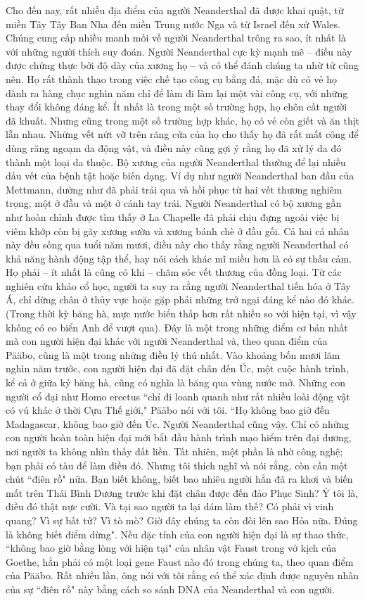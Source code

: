 \begin{multicols}{2}
	Cho đến nay, rất nhiều địa điểm của người Neanderthal đã được khai quật, từ miền Tây Tây Ban Nha đến miền Trung nước Nga và từ Israel đến xứ Wales. Chúng cung cấp nhiều manh mối về người Neanderthal trông ra sao, ít nhất là với những người thích suy đoán. Người Neanderthal cực kỳ mạnh mẽ -- điều này được chứng thực bởi độ dày của xương họ -- và có thể đánh chúng ta nhừ tử cũng nên. Họ rất thành thạo trong việc chế tạo công cụ bằng đá, mặc dù có vẻ họ dành ra hàng chục nghìn năm chỉ để làm đi làm lại một vài công cụ, với những thay đổi không đáng kể. Ít nhất là trong một số trường hợp, họ chôn cất người đã khuất. Nhưng cũng trong một số trường hợp khác, họ có vẻ còn giết và ăn thịt lẫn nhau. Những vết nứt vỡ trên răng cửa của họ cho thấy họ đã rất mất công để dùng răng ngoạm da động vật, và điều này cũng gợi ý rằng họ đã xử lý da đó thành một loại da thuộc. Bộ xương của người Neanderthal thường để lại nhiều dấu vết của bệnh tật hoặc biến dạng. Ví dụ như người Neanderthal ban đầu của Mettmann, dường như đã phải trải qua và hồi phục từ hai vết thương nghiêm trọng, một ở đầu và một ở cánh tay trái. Người Neanderthal có bộ xương gần như hoàn chỉnh được tìm thấy ở La Chapelle đã phải chịu đựng ngoài việc bị viêm khớp còn bị gãy xương sườn và xương bánh chè ở đầu gối. Cả hai cá nhân này đều sống qua tuổi năm mươi, điều này cho thấy rằng người Neanderthal có khả năng hành động tập thể, hay nói cách khác mĩ miều hơn là có sự thấu cảm. Họ phải -- ít nhất là cũng có khi -- chăm sóc vết thương của đồng loại.
	\vskip 0.1cm
	Từ các nghiên cứu khảo cổ học, người ta suy ra rằng người Neanderthal tiến hóa ở Tây Á, chỉ dừng chân ở thủy vực hoặc gặp phải những trở ngại đáng kể nào đó khác. (Trong thời kỳ băng hà, mực nước biển thấp hơn rất nhiều so với hiện tại, vì vậy không có eo biển Anh để vượt qua). Đây là một trong những điểm cơ bản nhất mà con người hiện đại khác với người Neanderthal và, theo quan điểm của Pääbo, cũng là một trong những điều lý thú nhất. Vào khoảng bốn mươi lăm nghìn năm trước, con người hiện đại đã đặt chân đến Úc, một cuộc hành trình, kể cả ở giữa kỷ băng hà, cũng có nghĩa là băng qua vùng nước mở. Những con người cổ đại như Homo erectus ``chỉ đi loanh quanh như rất nhiều loài động vật có vú khác ở thời Cựu Thế giới," Pääbo nói với tôi. ``Họ không bao giờ đến Madagascar, không bao giờ đến Úc. Người Neanderthal cũng vậy. Chỉ có những con người hoàn toàn hiện đại mới bắt đầu hành trình mạo hiểm trên đại dương, nơi người ta không nhìn thấy đất liền. Tất nhiên, một phần là nhờ công nghệ; bạn phải có tàu để làm điều đó. Nhưng tôi thích nghĩ và nói rằng, còn cần một chút ``điên rồ" nữa. Bạn biết không, biết bao nhiêu người hẳn đã ra khơi và biến mất trên Thái Bình Dương trước khi đặt chân được đến đảo Phục Sinh? Ý tôi là, điều đó thật nực cười. Và tại sao người ta lại dám làm thế? Có phải vì vinh quang? Vì sự bất tử? Vì tò mò? Giờ đây chúng ta còn đòi lên sao Hỏa nữa. Đúng là không biết điểm dừng". Nếu đặc tính của con người hiện đại là sự thao thức, ``không bao giờ bằng lòng với hiện tại" của nhân vật Faust trong vở kịch của Goethe, hẳn phải có một loại gene Faust nào đó trong chúng ta, theo quan điểm của Pääbo. Rất nhiều lần, ông nói với tôi rằng có thể xác định được nguyên nhân của sự ``điên rồ" này bằng cách so sánh DNA của Neanderthal và con người.

\end{multicols}
